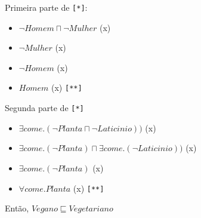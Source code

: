 \documentclass{article}
\begin{document}
Primeira parte de \texttt{[*]}:

\begin{itemize}
    \item [] $\neg Homem \sqcap \neg Mulher$ (x)
    \item [] $\neg Mulher$ (x)
    \item [] $\neg Homem$ (x)
    \item [] $Homem$ (x) \texttt{[**]}
\end{itemize}

Segunda parte de \texttt{[*]}

\begin{itemize}
    \item [] $\exists come.(\neg Planta \sqcap \neg Laticinio))$ (x)
    \item [] $\exists come.(\neg Planta) \sqcap \exists come.(\neg Laticinio))$ (x)
    \item [] $\exists come.(\neg Planta)$ (x)
    \item [] $\forall come.Planta$ (x) \texttt{[**]}
\end{itemize}

Então, $Vegano \sqsubseteq Vegetariano$








\end{document}
